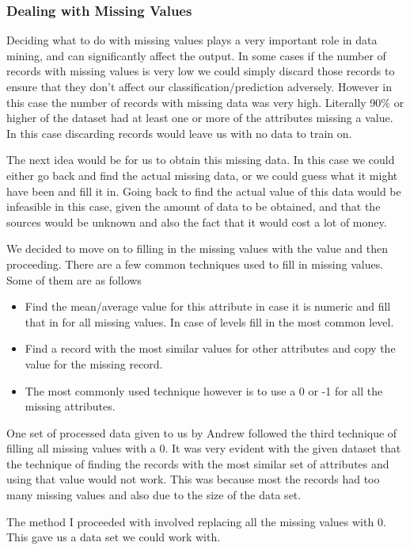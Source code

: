 \documentclass[paper=a4, fontsize=11pt]{scrartcl}	%
\numberwithin{equation}{section}		%
\numberwithin{figure}{section}			%
\numberwithin{table}{section}				%
\begin{document}
\subsubsection{Dealing with Missing Values}

Deciding what to do with missing values plays a very important role in data mining, and can significantly affect the output. In some cases if the number of records with missing  values is very low we could simply discard those records to ensure that they don't affect our classification/prediction adversely. However in this case the number of records with missing data was very high. Literally 90\% or higher of the dataset had at least one or more of the attributes missing a value. In this case discarding records would leave us with no data to train on.

The next idea would be for us to obtain this missing data. In this case we could either go back and find the actual missing data, or we could guess what it might have been and fill it in. Going back to find the actual value of this data would be infeasible in this case, given the amount of data to be obtained, and that the sources would be unknown and also the fact that it would cost a lot of money.

We decided to move on to filling in the missing values with the value and then proceeding. There are a few common techniques used to fill in missing values. Some of them are as follows
\begin{itemize}
	\item
	Find the mean/average value for this attribute in case it is numeric and fill that in for all missing values. In case of levels fill in the most common level.
	\item
	Find a record with the most similar values for other attributes and copy the value for the missing record.
	\item
	The most commonly used technique however is to use a 0 or -1 for all the missing attributes.
\end{itemize}

One set of processed data given to us by Andrew followed the third technique of filling all missing values with a 0. It was very evident with the given dataset that the technique of finding the records with the most similar set of attributes and using that value would not work. This was because most the records had too many missing values and also due to the size of the data set.

The method I proceeded with involved replacing all the missing values with 0. This gave us a data set we could work with.
\end{document}
